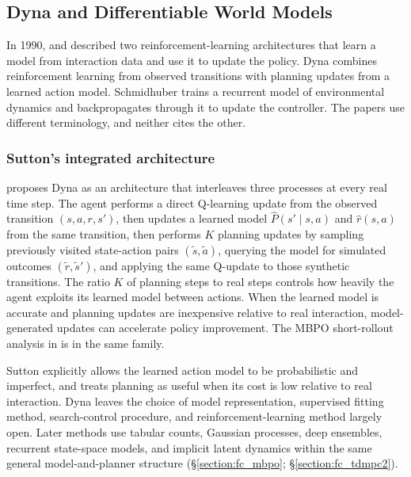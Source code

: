 \subsection{Dyna and Differentiable World Models}
\label{section:fc_origins1990}

In 1990, \citet{sutton1990} and \citet{Schmidhuber1990} described two reinforcement-learning architectures that learn a model from interaction data and use it to update the policy. Dyna combines reinforcement learning from observed transitions with planning updates from a learned action model. Schmidhuber trains a recurrent model of environmental dynamics and backpropagates through it to update the controller. The papers use different terminology, and neither cites the other.

\subsubsection{Sutton's integrated architecture}
\label{section:fc_origins_sutton}

\citet{sutton1990} proposes Dyna as an architecture that interleaves three processes at every real time step. The agent performs a direct Q-learning update from the observed transition $(s, a, r, s')$, then updates a learned model $\widehat{P}(s' \mid s, a)$ and $\widehat{r}(s, a)$ from the same transition, then performs $K$ planning updates by sampling previously visited state-action pairs $(\tilde{s}, \tilde{a})$, querying the model for simulated outcomes $(\tilde{r}, \tilde{s}')$, and applying the same Q-update to those synthetic transitions. The ratio $K$ of planning steps to real steps controls how heavily the agent exploits its learned model between actions. When the learned model is accurate and planning updates are inexpensive relative to real interaction, model-generated updates can accelerate policy improvement. The MBPO short-rollout analysis in \citet{janner2019model} is in the same family.

Sutton explicitly allows the learned action model to be probabilistic and imperfect, and treats planning as useful when its cost is low relative to real interaction. Dyna leaves the choice of model representation, supervised fitting method, search-control procedure, and reinforcement-learning method largely open. Later methods use tabular counts, Gaussian processes, deep ensembles, recurrent state-space models, and implicit latent dynamics within the same general model-and-planner structure (\S\ref{section:fc_mbpo}; \S\ref{section:fc_tdmpc2}).

